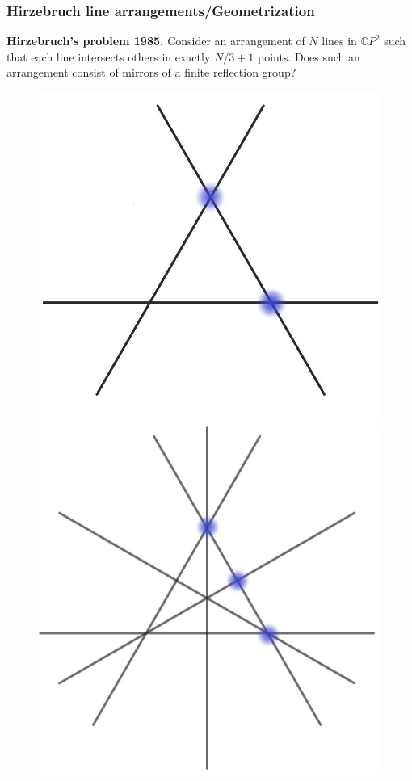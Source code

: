 \documentclass{beamer}
\begin{document}
\begin{frame}
	\frametitle{Hirzebruch line arrangements/Geometrization}
	
	{\bf Hirzebruch's problem 1985.} Consider an arrangement of \(N\) lines in $\mathbb CP^2$ such that each line intersects others in exactly \(N/3 + 1\) points. Does such an arrangement consist of mirrors of a finite reflection group?
	\pause
	\vspace{-1mm}
	\begin{figure}[!h]
		\includegraphics[scale=.1]{Hirzebruch1}
		\includegraphics[scale=.1]{Hirzebruch2}

\end{figure}
\end{frame}
\end{document}
